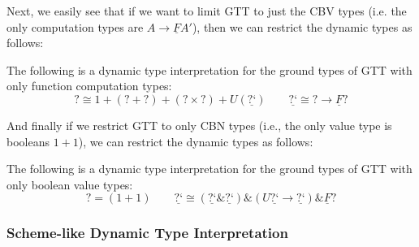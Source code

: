 \documentclass[acmsmall,nonacm]{acmart}
\renewcommand{\u}{\underline}
\newcommand{\dynv}{{?}}
\newcommand{\dync}{\u {\text{?`}}}
\newcommand{\with}{\mathbin{\&}}
\begin{document}
\begin{longonly}
Next, we easily see that if we want to limit GTT to just the CBV types
(i.e. the only computation types are $A \to \u F A'$), then we can
restrict the dynamic types as follows:
\begin{definition}
  The following is a dynamic type interpretation for the ground types of
  GTT with only function computation types:
  \[
    \dynv \cong 1 + (\dynv + \dynv) + (\dynv \times \dynv) + U(\dync) \qquad
    \dync \cong \dynv \to \u F \dynv
  \]
\end{definition}

And finally if we restrict GTT to only CBN types (i.e., the only value
type is booleans $1+1$), we can restrict the dynamic types as follows:
\begin{definition}
  The following is a dynamic type interpretation for the ground types of
  GTT with only boolean value types:
  \[
    \dynv = (1 + 1) \qquad
    \dync \cong (\dync \with \dync) \with (U\dync \to \dync)
    \with \u F \dynv
  \]
\end{definition}
\end{longonly}

\subsubsection{Scheme-like Dynamic Type Interpretation}
\end{document}
